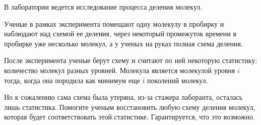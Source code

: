В лаборатории ведется исследование процесса деления молекул. 

Ученые в рамках эксперимента помещают одну молекулу в пробирку и наблюдают над схемой ее деления, через некоторый промежуток времени в пробирке уже несколько молекул, а у ученых на руках полная схема деления.

После эксперимента ученые берут схему и считают по ней некоторую статистику: количество молекул разных уровней. Молекула является молекулой уровня $i$ тогда, когда она породила как минимум еще $i$ поколений молекул.

Но к сожалению сама схема была утеряна, из-за стажера лаборанта, осталась лишь статистика. Помогите ученым восстановить любую схему деления молекул, которая будет соответствовать этой статистике. Гарантируется, что это возможно.
